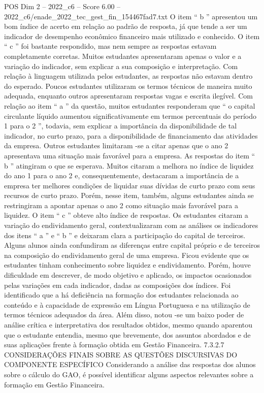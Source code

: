 \begin{textsample}{POS Dim 2 – 2022\_c6 – Score 6.00 – 2022\_c6/enade\_2022\_tec\_gest\_fin\_154467fad7.txt}
O item “ b ” apresentou um bom índice de acerto em relação ao padrão de resposta, já que tende a ser um indicador de desempenho econômico financeiro mais utilizado e conhecido.
O item “ c ” foi bastante respondido, mas nem sempre as respostas estavam completamente corretas.
Muitos estudantes apresentaram apenas o valor e a variação do indicador, sem explicar a sua composição e interpretação.
Com relação à linguagem utilizada pelos estudantes, as respostas não estavam dentro do esperado.
Poucos estudantes utilizaram os termos técnicos de maneira muito adequada, enquanto outros apresentaram respostas vagas e escrita ilegível.
Com relação ao item “ a ” da questão, muitos estudantes responderam que “ o capital circulante líquido aumentou significativamente em termos percentuais do período 1 para o 2 ”, todavia, sem explicar a importância da disponibilidade de tal indicador, no curto prazo, para a disponibilidade de financiamento das atividades da empresa.
Outros estudantes limitaram -se a citar apenas que o ano 2 apresentava uma situação mais favorável para a empresa.
As respostas do item “ b ” atingiram o que se esperava.
Muitos citaram a melhora no índice de liquidez do ano 1 para o ano 2 e, consequentemente, destacaram a importância de a empresa ter melhores condições de liquidar suas dívidas de curto prazo com seus recursos de curto prazo.
Porém, nesse item, também, alguns estudantes ainda se restringiram a apontar apenas o ano 2 como situação mais favorável para a liquidez.
O item “ c ” obteve alto índice de respostas.
Os estudantes citaram a variação do endividamento geral, contextualizaram com as análises os indicadores dos itens “ a ” e “ b ” e deixaram clara a participação do capital de terceiros.
Alguns alunos ainda confundiram as diferenças entre capital próprio e de terceiros na composição do endividamento geral de uma empresa.
Ficou evidente que os estudantes tinham conhecimento sobre liquidez e endividamento.
Porém, houve dificuldade em descrever, de modo objetivo e aplicado, os impactos ocasionados pelas variações em cada indicador, dadas as composições dos índices.
Foi identificado que a há deficiência na formação dos estudantes relacionada ao conteúdo e à capacidade de expressão em Língua Portuguesa e na utilização de termos técnicos adequados da área.
Além disso, notou -se um baixo poder de análise crítica e interpretativa dos resultados obtidos, mesmo quando aparentou que o estudante entendia, mesmo que brevemente, dos assuntos abordados e de suas aplicações frente à formação obtida em Gestão Financeira. 7.3.2.7 CONSIDERAÇÕES FINAIS SOBRE AS QUESTÕES DISCURSIVAS DO COMPONENTE ESPECÍFICO Considerando a análise das respostas dos alunos sobre o cálculo do GAO, é possível identificar alguns aspectos relevantes sobre a formação em Gestão Financeira.

\end{textsample}
